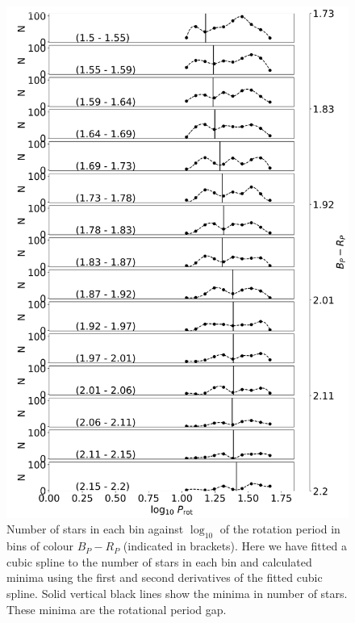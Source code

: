 \begin{figure}
\centering
  \includegraphics[width=\textwidth]{Figures/rot_gap_figures/n_col.png}
  \caption{
  	Number of stars in each bin against $\log_{10}$ of the rotation period in bins of colour \gaia{} $B_P-R_P$ (indicated in brackets). Here we have fitted a cubic spline to the number of stars in each bin and calculated minima using the first and second derivatives of the fitted cubic spline. Solid vertical black lines show the minima in number of stars. These minima are the rotational period gap.
}
  \label{fig:n_col}
\end{figure}

